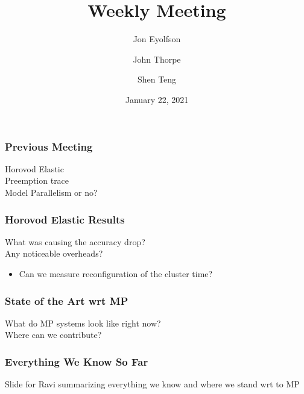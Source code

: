 

\title{Weekly Meeting}
\date{January 22, 2021}
\author{Jon Eyolfson \and John Thorpe \and Shen Teng}



  \begin{frame}[plain]
    \titlepage
  \end{frame}

  \setcounter{framenumber}{0}

  \begin{frame}
    \frametitle{Previous Meeting}

    Horovod Elastic \\
    Preemption trace \\
    Model Parallelism or no?
  \end{frame}

  \begin{frame}
    \frametitle{Horovod Elastic Results}

    What was causing the accuracy drop? \\
    Any noticeable overheads?
    \begin{itemize}
      \item Can we measure reconfiguration of the cluster time?
    \end{itemize}
  \end{frame}

  \begin{frame}
    \frametitle{State of the Art wrt MP}

    What do MP systems look like right now? \\
    Where can we contribute?
  \end{frame}

  \begin{frame}
    \frametitle{Everything We Know So Far}

    Slide for Ravi summarizing everything we know and where we stand wrt to MP
  \end{frame}

